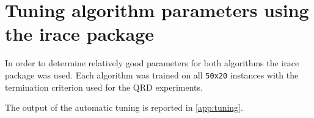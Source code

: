\section{Tuning algorithm parameters using the irace package}
\label{tune}

In order to determine relatively good parameters for both algorithms the irace package was used.
Each algorithm was trained on all \verb!50x20! instances with the termination criterion used for the QRD experiments.

The output of the automatic tuning is reported in \ref{app:tuning}.